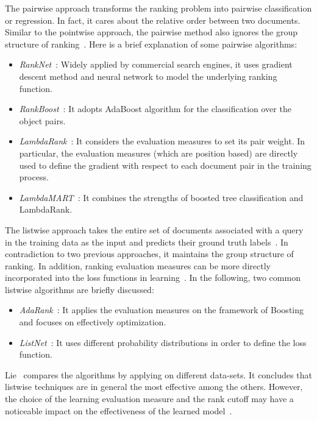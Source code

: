 The pairwise approach transforms the ranking problem into pairwise classification or regression. In fact, it cares about the relative order between two documents. Similar to the pointwise approach, the pairwise method also ignores the group structure of ranking~\cite{l2r-intro}. Here is a brief explanation of some pairwise algorithms:

\begin{itemize}
\item \textit{RankNet}~\cite{l2r-ranknet}: Widely applied by commercial search engines, it uses gradient descent method and neural network to model the underlying ranking function.
\item \textit{RankBoost}~\cite{l2r-rankboost}: It adopts AdaBoost algorithm for the classification over the object pairs.
\item \textit{LambdaRank}~\cite{l2r-lambdarank}: It considers the evaluation measures to set its pair weight. In particular, the evaluation measures (which are position based) are directly used to define the gradient with respect to each document pair in the training process.
\item \textit{LambdaMART}~\cite{l2r-lambdamart}: It combines the strengths of boosted tree classification and LambdaRank.
\end{itemize}

The listwise approach takes the entire set of documents associated with a query in the training data as the input and predicts their ground truth labels~\cite{l2r-book}. In contradiction to two previous approaches, it maintains the group structure of ranking. In addition, ranking evaluation measures can be more directly incorporated into the loss functions in learning~\cite{l2r-intro}. In the following, two common listwise algorithms are briefly discussed:

\begin{itemize}
\item \textit{AdaRank}~\cite{l2r-adarank}: It applies the evaluation measures on the framework of Boosting and focuses on effectively optimization.
\item \textit{ListNet}~\cite{l2r-listnet}: It uses different probability distributions in order to define the loss function.
\end{itemize}

Lie~\cite{l2r-book} compares the algorithms by applying on different data-sets. It concludes that listwise techniques are in general the most effective among the others. However, the choice of the learning evaluation measure and the rank cutoff may have a noticeable impact on the effectiveness of the learned model~\cite{l2r-when}.

